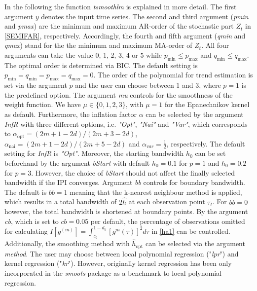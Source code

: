 \documentclass[12pt]{article}
\begin{document}
In the following the function \textit{tsmoothlm} is explained in more detail. The first argument $y$ denotes the input time series. The second and third argument (\textit{pmin} and \textit{pmax}) are the minimum and maximum AR-order of the stochastic part $Z_t$ in \eqref{SEMIFAR}, respectively. Accordingly, the fourth and fifth argument (\textit{qmin} and \textit{qmax}) stand for the the minimum and maximum MA-order of $Z_t$. All four arguments can take the value 0, 1, 2, 3, 4 or 5 while $p_{\text{min}} \leq  p_{\text{max}}$ and $q_{\text{min}} \leq  q_{\text{max}}$. The optimal order is determined via BIC. The default setting is $p_{\text{min}} = q_{\text{min}} = p_{\text{max}} = q_{\text{max}} = 0$. The order of the polynomial for trend estimation is set via the argument $p$ and the user can choose between 1 and 3, where $p = 1$ is the predefined option. The argument \textit{mu} controls for the smoothness of the weight function. We have $\mu \in \{0,1,2,3\}$, with $\mu = 1$ for the Epanechnikov kernel as default. Furthermore, the inflation factor $\alpha$ can be selected by the argument \textit{InfR} with three different options, i.e. \textit{"Opt"}, \textit{"Nai"} and \textit{"Var"}, which corresponds to $\alpha_{\text{opt}} = (2m + 1 - 2d) / (2m + 3 - 2d)$, $\alpha_{\text{nai}} = (2m + 1 - 2d) / (2m + 5 - 2d)$ and $\alpha_{var} = \frac{1}{2}$, respectively. The default setting for \textit{InfR} is \textit{"Opt"}.
Moreover, the starting bandwidth $h_0$ can be set beforehand by the argument \textit{bStart} with default $h_0 = 0.1$ for $p =1$ and $h_0 = 0.2$ for $p = 3$. However, the choice of \textit{bStart} should not affect the finally selected bandwidth if the IPI converges. Argument \textit{bb} controls for boundary bandwidth. The default is $bb = 1$ meaning that the k-nearest neighbour method is applied, which results in a total bandwidth of $2\hat{h}$ at each observation point $\tau_t$. For $\textit{bb} = 0$ however, the total bandwidth is shortened at boundary points. By the argument \textit{cb}, which is set to $\textit{cb} = 0.05$ per default, the percentage of observations omitted for calculating $I[g^{(m)}] = \int_{c_b}^{1-d_b}[g^{m}(\tau)]^2d\tau$ in \eqref{ha1} can be controlled. Additionally, the smoothing method with $\hat{h}_{\text{opt}}$ can be selected via the argument \textit{method}. The user may choose between local polynomial regression ("\textit{lpr}") and kernel regression ("\textit{kr}"). However, originally kernel regression has been only incorporated in the \textit{smoots} package as a benchmark to local polynomial regression.
\end{document}
